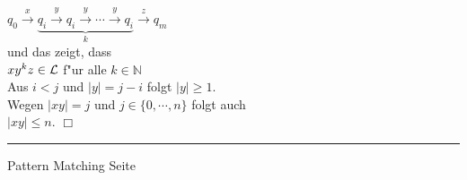 \begin{slide}{}
\hspace*{1.3cm} $q_0 \stackrel{x}{\rightarrow} \underbrace{q_i \stackrel{y}{\rightarrow} q_i \stackrel{y}{\rightarrow} \cdots \stackrel{y}{\rightarrow} q_i}_{k}
\stackrel{z}{\rightarrow} q_m$ \\[0.3cm]
und das zeigt, dass \\[0.3cm]
\hspace*{1.3cm} $x y^k z \in {\cal L}$ \quad f"ur alle $k \in \mathbb{N}$ \\[0.3cm]
Aus $i < j$ und  $|y| = j - i$ folgt $|y| \geq 1$. \\[0.3cm]
Wegen $|xy| = j$ und $j \in \{0,\cdots,n\}$ folgt auch \\[0.3cm]
\hspace*{1.3cm} $|xy| \leq n$. \hspace*{\fill} $\Box$

\vspace*{\fill}
\tiny \addtocounter{mypage}{1}
\rule{17cm}{1mm}
Pattern Matching \hspace*{\fill} Seite 
\end{slide}


